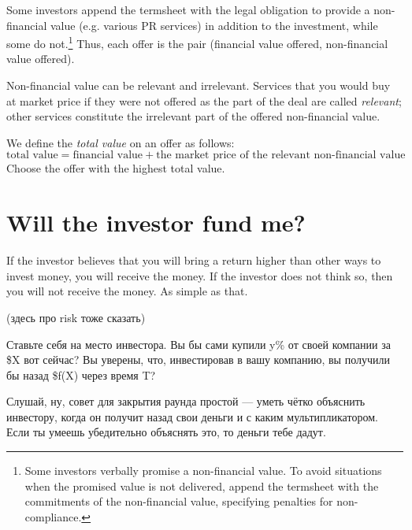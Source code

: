 \documentclass[11pt]{article}
\theoremstyle{remark}
\theoremstyle{definition}
\begin{document}
Some investors append the termsheet with the legal obligation to provide a non-financial value (e.g. various PR services) in addition to the investment, while some do not.\footnote{Some investors verbally promise a non-financial value. To avoid situations when the promised value is not delivered, append the termsheet with the commitments of the non-financial value, specifying penalties for non-compliance.} Thus, each offer is the pair (financial value offered, non-financial value offered).

Non-financial value can be relevant and irrelevant. Services that you would buy at market price if they were not offered as the part of the deal are called \textit{relevant}; other services constitute the irrelevant part of the offered non-financial value. 


We define the \textit{total value} on an offer as follows: $$\text{total value} = \text{financial value} + \text{the market price of the relevant non-financial value}$$ Choose the offer with the highest total value.















\section{Will the investor fund me?}

If the investor believes that you will bring a return higher than other ways to invest money, you will receive the money. If the investor does not think so, then you will not receive the money. As simple as that.

(здесь про risk тоже сказать)

Ставьте себя на место инвестора. Вы бы сами купили y\% от своей компании за \$X вот сейчас? Вы уверены, что, инвестировав в вашу компанию, вы получили бы назад \$f(X) через время T?



Слушай, ну, совет для закрытия раунда простой — уметь чётко объяснить инвестору, когда он получит назад свои деньги и с каким мультипликатором. Если ты умеешь убедительно объяснять это, то деньги тебе дадут.
\end{document}

